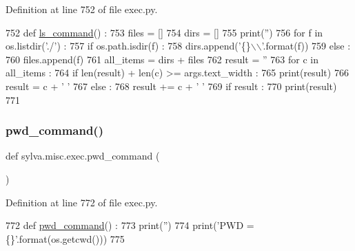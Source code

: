 Definition at line 752 of file exec.\+py.


\begin{DoxyCode}
752 \textcolor{keyword}{def }\hyperlink{namespacesylva_1_1misc_1_1exec_a2a286b4556ac1dcfb9fa47e672f7bee0}{ls\_command}() :
753   files = []
754   dirs = []
755   print(\textcolor{stringliteral}{''})
756   \textcolor{keywordflow}{for} f \textcolor{keywordflow}{in} os.listdir(\textcolor{stringliteral}{'./'}) :
757     \textcolor{keywordflow}{if} os.path.isdir(f) :
758       dirs.append(\textcolor{stringliteral}{'\{\}\(\backslash\)\(\backslash\)'}.format(f))
759     \textcolor{keywordflow}{else} :
760       files.append(f)
761   all\_items = dirs + files
762   result = \textcolor{stringliteral}{''}
763   \textcolor{keywordflow}{for} c \textcolor{keywordflow}{in} all\_items :
764     \textcolor{keywordflow}{if} len(result) + len(c) >= args.text\_width :
765       print(result)
766       result = c + \textcolor{stringliteral}{' '}
767     \textcolor{keywordflow}{else} :
768       result += c + \textcolor{stringliteral}{' '}
769   \textcolor{keywordflow}{if} result :
770     print(result)
771 
\end{DoxyCode}
\mbox{\label{namespacesylva_1_1misc_1_1exec_a2ac5cdf0face6797b9b5f2b60e7095e7}} 
\subsubsection{\texorpdfstring{pwd\+\_\+command()}{pwd\_command()}}
{\footnotesize\ttfamily def sylva.\+misc.\+exec.\+pwd\+\_\+command (\begin{DoxyParamCaption}{ }\end{DoxyParamCaption})}



Definition at line 772 of file exec.\+py.


\begin{DoxyCode}
772 \textcolor{keyword}{def }\hyperlink{namespacesylva_1_1misc_1_1exec_a2ac5cdf0face6797b9b5f2b60e7095e7}{pwd\_command}() :
773   print(\textcolor{stringliteral}{''})
774   print(\textcolor{stringliteral}{'PWD = \{\}'}.format(os.getcwd()))
775 
\end{DoxyCode}
\mbox{\label{namespacesylva_1_1misc_1_1exec_a670ec00a77a111ff274f7d3dc3989966}} 
